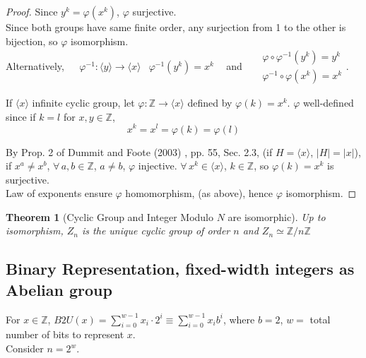 \documentclass[10pt]{amsart}
\newtheorem{theorem}{Theorem}
\begin{document}
\begin{multicols*}{2}
\begin{proof}
Since $y^k = \varphi(x^k)$, $\varphi$ surjective. \\

Since both groups have same finite order, any surjection from 1 to the other is bijection, so $\varphi$ isomorphism.  \\

Alternatively, $\begin{aligned}
& \varphi^{-1}:\langle y \rangle \to \langle x \rangle
& \varphi^{-1}(y^k) = x^k 
\end{aligned}$ \quad \, and \quad \, $\begin{aligned} & \varphi \circ \varphi^{-1}(y^k) = y^k \\
& \varphi^{-1}\circ \varphi(x^k) = x^k \end{aligned}$.

If $\langle x \rangle$ infinite cyclic group, let $\varphi : \mathbb{Z} \to \langle x \rangle$ defined by $\varphi(k) = x^k$.  $\varphi$ well-defined since if $k = l$ for $x,y \in \mathbb{Z}$, 
\[
x^k = x^l = \varphi(k) = \varphi(l)
\]

By Prop. 2 of Dummit and Foote (2003) \cite{DuFo2003}, pp. 55, Sec. 2.3, (if $H=\langle x \rangle$, $|H| = |x|$), if $x^a \neq x^b$, $\forall\, a, b \in \mathbb{Z}$, $a\neq b$, $\varphi$ injective. $\forall \, x^k \in \langle x \rangle$, $k \in \mathbb{Z}$, so $\varphi(k) = x^k$ is surjective. \\
Law of exponents ensure $\varphi$ homomorphism, (as above), hence $\varphi$ isomorphism. 

\end{proof}

\begin{theorem}[Cyclic Group and Integer Modulo $N$ are isomorphic]\label{Thm:CyclicGroupIntegerModuloNIsomorphic}
	Up to isomorphism, $Z_n$ is the unique cyclic group of order $n$ and $Z_n \simeq \mathbb{Z}/ n\mathbb{Z}$
\end{theorem}

\subsection{Binary Representation, fixed-width integers as Abelian group}

For $x\in \mathbb{Z}$, $B2U(x) = \sum_{i=0}^{w-1} x_i \cdot 2^i \equiv \sum_{i=0}^{w-1} x_i b^i$, where $b=2$, $w= $ total number of bits to represent $x$. \\

Consider $n=2^w$. \\


\end{multicols*}
\end{document}
